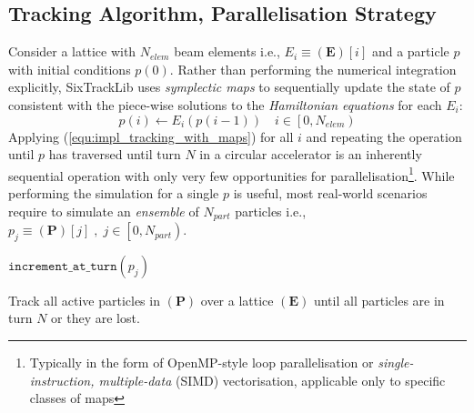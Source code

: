 \documentclass[a4paper,
               refpage,       %
               keeplastbox,   %
               ]{jacow}
\begin{document}
\subsection{Tracking Algorithm, Parallelisation Strategy}
Consider a lattice with $N_{elem}$ beam elements i.e., $E_i \equiv \left(\mathbf{E}\right)\left[i\right]$ and a particle $p$ with initial conditions $p\left(0\right)$. Rather than performing the numerical integration explicitly, SixTrackLib uses \textit{symplectic maps} to sequentially update the state of $p$ consistent with the piece-wise solutions to the \textit{Hamiltonian equations} for each $E_i$:
\begin{equation}
    \label{equ:impl_tracking_with_maps}
    p\left(i\right) \leftarrow E_i\left( p\left( i - 1 \right) \right) \quad i \in \left[0, N_{elem}\right)
\end{equation}
Applying (\ref{equ:impl_tracking_with_maps}) for all $i$ and repeating the operation until $p$ has traversed until turn $N$ in a circular accelerator is an inherently sequential operation with only very few opportunities for parallelisation\footnote{Typically in the form of OpenMP-style loop parallelisation or \textit{single-instruction, multiple-data} (SIMD) vectorisation, applicable only to specific classes of maps}. While performing the simulation for a single $p$ is useful, most real-world scenarios require to simulate an \textit{ensemble} of $N_{part}$ particles i.e., $p_j \equiv \left(\mathbf{P}\right)\left[j\right]\;,\;j\in\left[0,N_{part}\right)$.
\begin{algorithm}[!hbt]
\begin{algorithmic}[1]
\label{alg1:line:loop_particles}
    \label{alg1:line:ref_p}
    \label{alg1:line:loop_turns} 
        \label{alg1:line:loop_lattice}
            \label{alg1:line:ref_elem}
            \label{alg1:line:apply_map}
            \label{alg1:line:is_lost_check}
            \EndIf
        \EndFor
        \label{alg1:line:is_lost_check2}
            \State $\texttt{increment\_at\_turn}(p_j)$\label{alg1:line:inc_turn}
        \EndIf
    \EndWhile
\EndFor
\EndProcedure
\end{algorithmic}
\caption{Track all active particles in $\left(\mathbf{P}\right)$ over a lattice $\left(\mathbf{E}\right)$ until all particles are in turn $N$ or they are lost.}
\label{alg:track_until_turn}
\end{algorithm}
\end{document}

